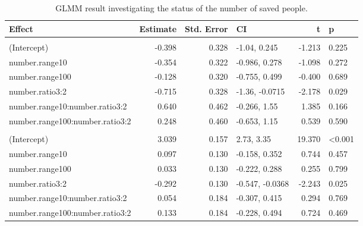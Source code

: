 \documentclass[
]{article}
\begin{document}
\begin{table}
\centering
\caption{\label{tab:n-saved-glmer-print}GLMM result investigating the status of the number of saved people.}
\centering
\begin{tabular}[t]{lrrlrl}
\toprule
Effect & Estimate & Std. Error & CI & t & p\\
\midrule
\addlinespace[0.3em]
\multicolumn{6}{l}{\textbf{binary ratings}}\\
\hspace{1em}(Intercept) & -0.398 & 0.328 & -1.04, 0.245 & -1.213 & 0.225\\
\hspace{1em}number.range10 & -0.354 & 0.322 & -0.986, 0.278 & -1.098 & 0.272\\
\hspace{1em}number.range100 & -0.128 & 0.320 & -0.755, 0.499 & -0.400 & 0.689\\
\hspace{1em}number.ratio3:2 & -0.715 & 0.328 & -1.36, -0.0715 & -2.178 & 0.029\\
\hspace{1em}number.range10:number.ratio3:2 & 0.640 & 0.462 & -0.266, 1.55 & 1.385 & 0.166\\
\hspace{1em}number.range100:number.ratio3:2 & 0.248 & 0.460 & -0.653, 1.15 & 0.539 & 0.590\\
\addlinespace[0.3em]
\multicolumn{6}{l}{\textbf{raw ratings}}\\
\hspace{1em}(Intercept) & 3.039 & 0.157 & 2.73, 3.35 & 19.370 & <0.001\\
\hspace{1em}number.range10 & 0.097 & 0.130 & -0.158, 0.352 & 0.744 & 0.457\\
\hspace{1em}number.range100 & 0.033 & 0.130 & -0.222, 0.288 & 0.255 & 0.799\\
\hspace{1em}number.ratio3:2 & -0.292 & 0.130 & -0.547, -0.0368 & -2.243 & 0.025\\
\hspace{1em}number.range10:number.ratio3:2 & 0.054 & 0.184 & -0.307, 0.415 & 0.294 & 0.769\\
\hspace{1em}number.range100:number.ratio3:2 & 0.133 & 0.184 & -0.228, 0.494 & 0.724 & 0.469\\
\bottomrule
\end{tabular}
\end{table}
\end{document}
